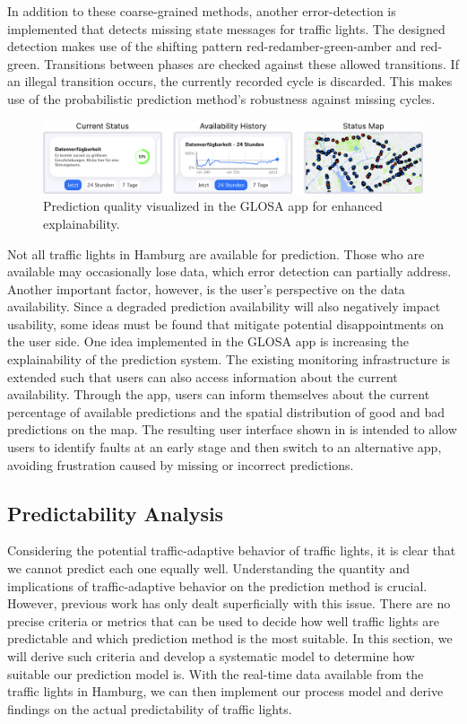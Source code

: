 In addition to these coarse-grained methods, another error-detection is implemented that detects missing state messages for traffic lights. The designed detection makes use of the shifting pattern red-redamber-green-amber and red-green. Transitions between phases are checked against these allowed transitions. If an illegal transition occurs, the currently recorded cycle is discarded. This makes use of the probabilistic prediction method's robustness against missing cycles.

\begin{figure}[htbp]
\centering
\includegraphics[width=\linewidth]{images/home-view-prediction-quality.png}
\caption{Prediction quality visualized in the GLOSA app for enhanced explainability.}
\label{fig:home-view-prediction-quality}
\end{figure}

Not all traffic lights in Hamburg are available for prediction. Those who are available may occasionally lose data, which error detection can partially address. Another important factor, however, is the user's perspective on the data availability. Since a degraded prediction availability will also negatively impact usability, some ideas must be found that mitigate potential disappointments on the user side. One idea implemented in the GLOSA app is increasing the explainability of the prediction system. The existing monitoring infrastructure is extended such that users can also access information about the current availability. Through the app, users can inform themselves about the current percentage of available predictions and the spatial distribution of good and bad predictions on the map. The resulting user interface shown in  is intended to allow users to identify faults at an early stage and then switch to an alternative app, avoiding frustration caused by missing or incorrect predictions.

\subsection{Predictability Analysis}

Considering the potential traffic-adaptive behavior of traffic lights, it is clear that we cannot predict each one equally well. Understanding the quantity and implications of traffic-adaptive behavior on the prediction method is crucial. However, previous work has only dealt superficially with this issue. There are no precise criteria or metrics that can be used to decide how well traffic lights are predictable and which prediction method is the most suitable. In this section, we will derive such criteria and develop a systematic model to determine how suitable our prediction model is. With the real-time data available from the traffic lights in Hamburg, we can then implement our process model and derive findings on the actual predictability of traffic lights.

